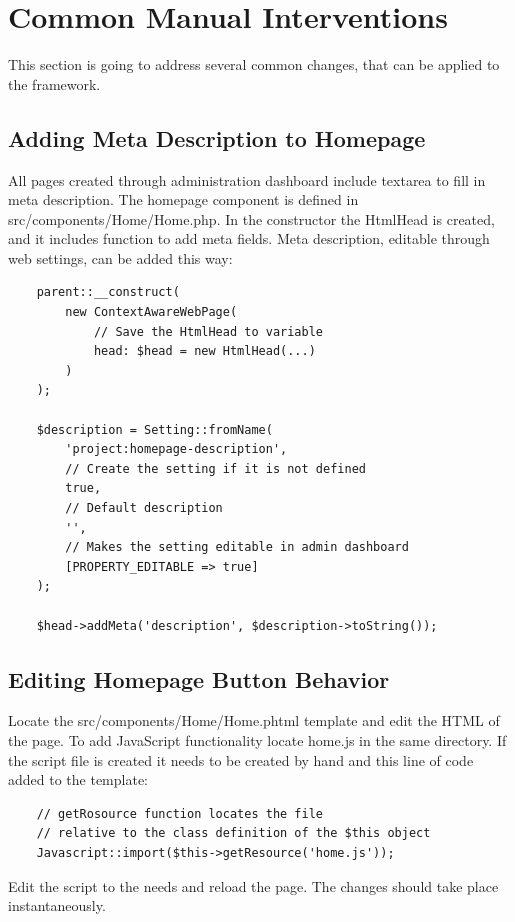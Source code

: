 \section{Common Manual Interventions}\label{sec:common-manual-interventions}
This section is going to address several common changes, that can be applied to the framework.

\subsection*{Adding Meta Description to Homepage}
All pages created through administration dashboard include textarea to fill in meta description.
The homepage component is defined in src/components/Home/Home.php.
In the constructor the HtmlHead is created, and it includes function to add meta fields.
Meta description, editable through web settings, can be added this way:

\begin{verbatim}
    parent::__construct(
        new ContextAwareWebPage(
            // Save the HtmlHead to variable
            head: $head = new HtmlHead(...)
        )
    );

    $description = Setting::fromName(
        'project:homepage-description',
        // Create the setting if it is not defined
        true,
        // Default description
        '',
        // Makes the setting editable in admin dashboard
        [PROPERTY_EDITABLE => true]
    );

    $head->addMeta('description', $description->toString());
\end{verbatim}

\subsection*{Editing Homepage Button Behavior}
Locate the src/components/Home/Home.phtml template and edit the HTML of the page.
To add JavaScript functionality locate home.js in the same directory.
If the script file is created it needs to be created by hand and this line of code added to the template:

\begin{verbatim}
    // getRosource function locates the file
    // relative to the class definition of the $this object
    Javascript::import($this->getResource('home.js'));
\end{verbatim}

Edit the script to the needs and reload the page.
The changes should take place instantaneously.

